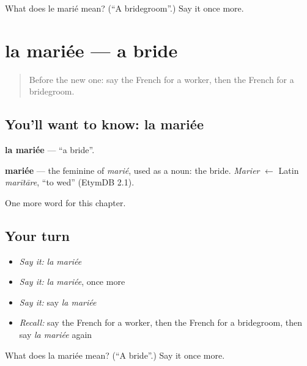 \begin{tcolorbox}[breakable,colback=teal!4,colframe=teal!35!black,title={Before you move on}]
What does le marié mean? (\textquotedblleft{}A bridegroom\textquotedblright{}.) Say it once more.
\end{tcolorbox}
\section[la mariée]{la mariée — a bride}

\label{lesson:FR-C197-mariee}



\begin{quote}
Before the new one: say the French for a worker, then the French for a bridegroom.
\end{quote}

\subsection*{You'll want to know: la mariée}
\textbf{la mariée} — \textquotedblleft{}a bride\textquotedblright{}.

\begin{cousinweb}
\textbf{mariée} — the feminine of \emph{marié}, used as a noun: the bride. \emph{Marier} $\leftarrow$ Latin \emph{marītāre}, \textquotedblleft{}to wed\textquotedblright{} (EtymDB 2.1).
\end{cousinweb}

\begin{grammarlens}[title={What you've built}]
One more word for this chapter.
\end{grammarlens}

\subsection*{Your turn}
\begin{itemize}
\raggedright
  \item \emph{Say it:} \emph{la mariée}
  \item \emph{Say it:} \emph{la mariée}, once more
  \item \emph{Say it:} say \emph{la mariée}
  \item \emph{Recall:} say the French for a worker, then the French for a bridegroom, then say \emph{la mariée} again
\end{itemize}

\begin{tcolorbox}[breakable,colback=teal!4,colframe=teal!35!black,title={Before you move on}]
What does la mariée mean? (\textquotedblleft{}A bride\textquotedblright{}.) Say it once more.
\end{tcolorbox}
